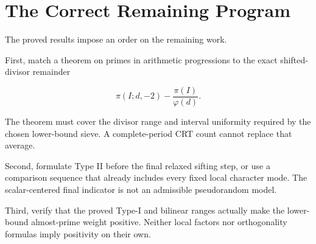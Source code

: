 \section{The Correct Remaining Program}

The proved results impose an order on the remaining work.

First, match a theorem on primes in arithmetic progressions to the exact
shifted-divisor remainder

\begin{equation*}
\pi(I;d,-2)-\frac{\pi(I)}{\varphi(d)}.
\end{equation*}

The theorem must cover the divisor range and interval uniformity required by
the chosen lower-bound sieve. A complete-period CRT count cannot replace that
average.

Second, formulate Type II before the final relaxed sifting step, or use a
comparison sequence that already includes every fixed local character mode.
The scalar-centered final indicator is not an admissible pseudorandom model.

Third, verify that the proved Type-I and bilinear ranges actually make the
lower-bound almost-prime weight positive. Neither local factors nor
orthogonality formulas imply positivity on their own.

